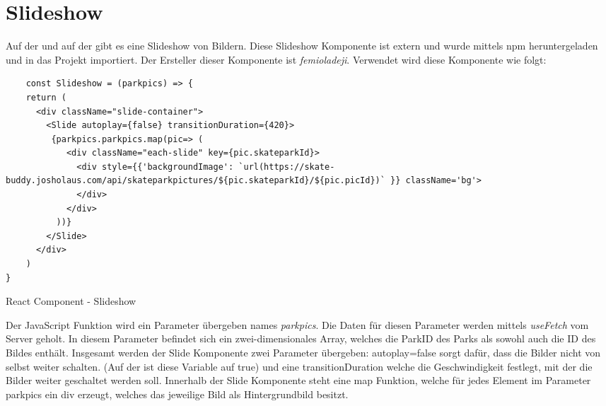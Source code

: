 \section{Slideshow}
\label{slideshow}

Auf der  und auf der  gibt es eine Slideshow von Bildern.
Diese Slideshow Komponente ist extern und wurde mittels npm heruntergeladen und in das 
Projekt importiert. Der Ersteller dieser Komponente ist \textit{femioladeji}. Verwendet wird diese 
Komponente wie folgt:

\begin{code}[htp]
\begin{lstlisting}
    const Slideshow = (parkpics) => {
    return (
      <div className="slide-container">
        <Slide autoplay={false} transitionDuration={420}>
         {parkpics.parkpics.map(pic=> (
            <div className="each-slide" key={pic.skateparkId}>
              <div style={{'backgroundImage': `url(https://skate-buddy.josholaus.com/api/skateparkpictures/${pic.skateparkId}/${pic.picId})` }} className='bg'>
              </div>
            </div>
          ))} 
        </Slide>
      </div>
    )
}
\end{lstlisting}
\caption{React Component - Slideshow}
\end{code}

Der JavaScript Funktion wird ein Parameter übergeben names \textit{parkpics}. Die 
Daten für diesen Parameter werden mittels \textit{useFetch} vom Server geholt. In diesem Parameter 
befindet sich ein zwei-dimensionales Array, welches die ParkID des Parks als sowohl auch die ID des 
Bildes enthält. Insgesamt werden der Slide Komponente zwei Parameter übergeben: autoplay={false} sorgt
dafür, dass die Bilder nicht von selbst weiter schalten. (Auf der  ist diese Variable auf true) und
eine transitionDuration welche die Geschwindigkeit festlegt, mit der die Bilder weiter geschaltet werden soll.
Innerhalb der Slide Komponente steht eine map Funktion, welche für jedes Element im Parameter parkpics 
ein div erzeugt, welches das jeweilige Bild als Hintergrundbild besitzt. 


